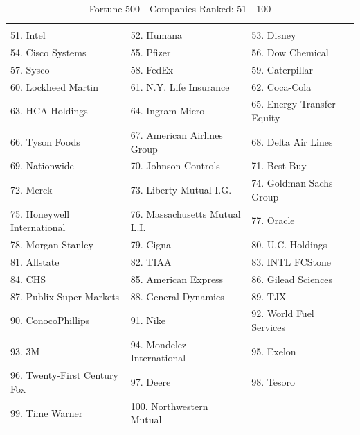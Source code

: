 \documentclass{book}
\begin{document}
\begin{table}[H]
\centering
\caption{Fortune 500 - Companies Ranked: 51 - 100}
\begin{tabular}{lll}
\hline
 & & \\
51. Intel
& 52. Humana
& 53. Disney
 \\ 
 54. Cisco Systems
& 55. Pfizer
& 56. Dow Chemical
 \\ 
57. Sysco
& 58. FedEx
& 59. Caterpillar
 \\ 
60. Lockheed Martin
& 61. N.Y. Life Insurance
& 62. Coca-Cola
 \\ 
63. HCA Holdings
& 64. Ingram Micro
& 65. Energy Transfer Equity
 \\ 
66. Tyson Foods
& 67. American Airlines Group
& 68. Delta Air Lines
 \\ 
69. Nationwide
& 70. Johnson Controls
& 71. Best Buy
 \\ 
72. Merck
& 73. Liberty Mutual I.G.
& 74. Goldman Sachs Group
 \\ 
75. Honeywell International
& 76. Massachusetts Mutual L.I.
& 77. Oracle
 \\ 
78. Morgan Stanley
& 79. Cigna
& 80. U.C. Holdings
 \\ 
81. Allstate
& 82. TIAA
& 83. INTL FCStone
 \\ 
84. CHS
& 85. American Express
& 86. Gilead Sciences
 \\ 
87. Publix Super Markets
& 88. General Dynamics
& 89. TJX
 \\ 
90. ConocoPhillips
& 91. Nike
& 92. World Fuel Services
 \\ 
93. 3M
& 94. Mondelez International
& 95. Exelon
 \\ 
96. Twenty-First Century Fox
& 97. Deere
& 98. Tesoro
 \\ 
99. Time Warner
& 100. Northwestern Mutual
 &
 \\ \hline

\end{tabular}
\end{table}
\end{document}
